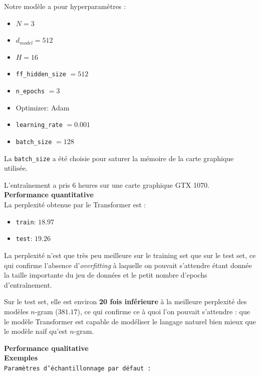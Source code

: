 Notre modèle a pour hyperparamètres :

\begin{itemize}
\item
  \(N = 3\)
\item
  \(d_{model} = 512\)
\item
  \(H = 16\)
\item
  \texttt{ff\_hidden\_size} $ = 512$
\item
  \texttt{n\_epochs} $ = 3$
\item
  Optimizer: Adam
\item
  \texttt{learning\_rate} $ = 0.001 $
\item
  \texttt{batch\_size} $ = 128$
\end{itemize}

La \texttt{batch\_size} a été choisie pour saturer la mémoire de la
carte graphique utilisée.

L'entraînement a pris 6 heures sur une carte graphique GTX 1070. \\

\noindent{}\textbf{Performance quantitative} \\

La perplexité obtenue par le Transformer est :

\begin{itemize}
\item
  \texttt{train}: \(18.97\)
\item
  \texttt{test}: \(19.26\)
\end{itemize}

La perplexité n'est que très peu meilleure sur le training set que sur
le test set, ce qui confirme l'absence d'\textit{overfitting} à laquelle
on pouvait s'attendre étant donnée la taille importante du jeu de
données et le petit nombre d'epochs d'entraînement.

Sur le test set, elle est environ \textbf{20 fois inférieure} à la
meilleure perplexité des modèles $n$-gram (\(381.17\)), ce qui confirme ce
à quoi l'on pouvait s'attendre : que le modèle Transformer est capable
de modéliser le langage naturel bien mieux que le modèle naïf qu'est
$n$-gram. \\

\newpage

\noindent{}\textbf{Performance qualitative} \\

\textbf{Exemples} \\

\noindent{} \texttt{Paramètres d'échantillonnage par défaut :}

